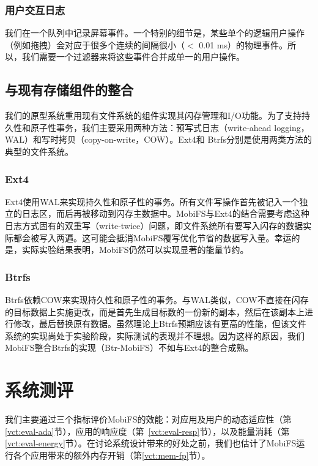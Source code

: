 \subsubsection{用户交互日志}
我们在一个队列中记录屏幕事件。一个特别的细节是，某些单个的逻辑用户操作（例如拖拽）会对应于很多个连续的间隔很小（$<$ 0.01 ms）的物理事件。所以，我们需要一个过滤器来将这些事件合并成单一的用户操作。

\subsection{与现有存储组件的整合}
\label{vct:ext4}

我们的原型系统重用现有文件系统的组件实现其闪存管理和I/O功能。为了支持持久性和原子性事务，我们主要采用两种方法：预写式日志（write-ahead logging，WAL）和写时拷贝（copy-on-write，COW）。Ext4和 Btrfs分别是使用两类方法的典型的文件系统。

\subsubsection{Ext4}
Ext4使用WAL来实现持久性和原子性的事务。所有文件写操作首先被记入一个独立的日志区，而后再被移动到闪存主数据中。MobiFS与Ext4的结合需要考虑这种日志方式固有的双重写（write-twice）问题，即文件系统所有要写入闪存的数据实际都会被写入两遍。这可能会抵消MobiFS覆写优化节省的数据写入量。幸运的是，实际实验结果表明，MobiFS仍然可以实现显著的能量节约。

\subsubsection{Btrfs}
Btrfs依赖COW来实现持久性和原子性的事务。与WAL类似，COW不直接在闪存的目标数据上实施更改，而是首先生成目标数的一份新的副本，然后在该副本上进行修改，最后替换原有数据。虽然理论上Btrfs预期应该有更高的性能，但该文件系统的实现尚处于实验阶段，实际测试的表现并不理想。因为这样的原因，我们MobiFS整合Btrfs的实现（Btr-MobiFS）不如与Ext4的整合成熟。

\section{系统测评}
\label{vct:eval}

我们主要通过三个指标评价MobiFS的效能：对应用及用户的动态适应性（第\ref{vct:eval-ada}节），应用的响应度（第~\ref{vct:eval-resp}节），以及能量消耗（第\ref{vct:eval-energy}节）。在讨论系统设计带来的好处之前，我们也估计了MobiFS运行各个应用带来的额外内存开销（第\ref{vct:mem-fp}节）。

